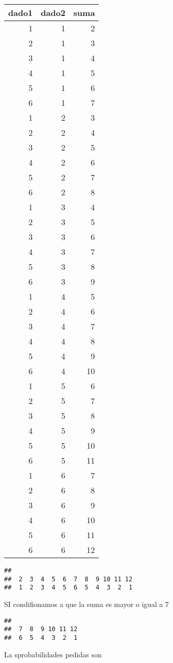 \documentclass[
]{article}
\newenvironment{Shaded}{\begin{snugshade}}{\end{snugshade}}
\newcommand{\DecValTok}[1]{\textcolor[rgb]{0.00,0.00,0.81}{#1}}
\newcommand{\KeywordTok}[1]{\textcolor[rgb]{0.13,0.29,0.53}{\textbf{#1}}}
\newcommand{\NormalTok}[1]{#1}
\newcommand{\OperatorTok}[1]{\textcolor[rgb]{0.81,0.36,0.00}{\textbf{#1}}}
\begin{document}
\begin{longtable}[]{@{}rrr@{}}
\toprule
dado1 & dado2 & suma\tabularnewline
\midrule
\endhead
1 & 1 & 2\tabularnewline
2 & 1 & 3\tabularnewline
3 & 1 & 4\tabularnewline
4 & 1 & 5\tabularnewline
5 & 1 & 6\tabularnewline
6 & 1 & 7\tabularnewline
1 & 2 & 3\tabularnewline
2 & 2 & 4\tabularnewline
3 & 2 & 5\tabularnewline
4 & 2 & 6\tabularnewline
5 & 2 & 7\tabularnewline
6 & 2 & 8\tabularnewline
1 & 3 & 4\tabularnewline
2 & 3 & 5\tabularnewline
3 & 3 & 6\tabularnewline
4 & 3 & 7\tabularnewline
5 & 3 & 8\tabularnewline
6 & 3 & 9\tabularnewline
1 & 4 & 5\tabularnewline
2 & 4 & 6\tabularnewline
3 & 4 & 7\tabularnewline
4 & 4 & 8\tabularnewline
5 & 4 & 9\tabularnewline
6 & 4 & 10\tabularnewline
1 & 5 & 6\tabularnewline
2 & 5 & 7\tabularnewline
3 & 5 & 8\tabularnewline
4 & 5 & 9\tabularnewline
5 & 5 & 10\tabularnewline
6 & 5 & 11\tabularnewline
1 & 6 & 7\tabularnewline
2 & 6 & 8\tabularnewline
3 & 6 & 9\tabularnewline
4 & 6 & 10\tabularnewline
5 & 6 & 11\tabularnewline
6 & 6 & 12\tabularnewline
\bottomrule
\end{longtable}

\begin{Shaded}
\end{Shaded}

\begin{verbatim}
## 
##  2  3  4  5  6  7  8  9 10 11 12 
##  1  2  3  4  5  6  5  4  3  2  1
\end{verbatim}

SI condifionamos a que la suma es mayor o igual a 7

\begin{Shaded}
\end{Shaded}

\begin{verbatim}
## 
##  7  8  9 10 11 12 
##  6  5  4  3  2  1
\end{verbatim}

La sprobabilidades pedidas son

\begin{Shaded}
\end{Shaded}
\end{document}
